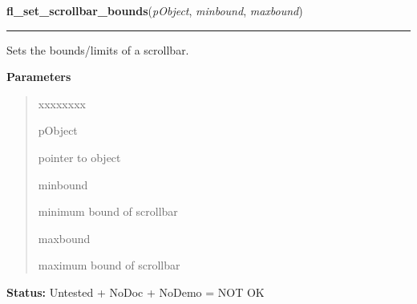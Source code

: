 \hspace{.8\funcindent}\begin{boxedminipage}{\funcwidth}

    \raggedright \textbf{fl\_set\_scrollbar\_bounds}(\textit{pObject}, \textit{minbound}, \textit{maxbound})

    \vspace{-1.5ex}

    \rule{\textwidth}{0.5\fboxrule}
\setlength{\parskip}{2ex}
    Sets the bounds/limits of a scrollbar.

\setlength{\parskip}{1ex}
      \textbf{Parameters}
      \vspace{-1ex}

      \begin{quote}
        \begin{Ventry}{xxxxxxxx}

          \item[pObject]

          pointer to object

          \item[minbound]

          minimum bound of scrollbar

          \item[maxbound]

          maximum bound of scrollbar

        \end{Ventry}

      \end{quote}

\textbf{Status:} Untested + NoDoc + NoDemo = NOT OK



    \end{boxedminipage}

    \label{xformslib:library:fl_get_scrollbar_bounds}

    \vspace{0.5ex}

